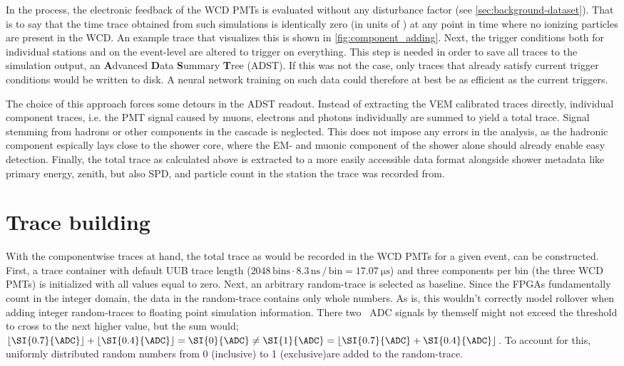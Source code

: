 In the process, the electronic feedback of the WCD PMTs is evaluated without any disturbance factor (see \autoref{sec:background-dataset}). That is to say that 
the time trace obtained from such simulations is identically zero (in units of \SI{}{\ADC}) at any point in time where no ionizing particles are present in the WCD. 
An example trace that visualizes this is shown in \autoref{fig:component_adding}. Next, the trigger conditions both for individual stations and on the event-level 
are altered to trigger on everything. This step is needed in order to save all traces to the simulation output, an \textbf{A}dvanced \textbf{D}ata \textbf{S}ummary 
\textbf{T}ree (ADST). If this was not the case, only traces that already satisfy current trigger conditions would be written to disk. A neural network training on 
such data could therefore at best be as efficient as the current triggers.

The choice of this approach forces some detours in the ADST readout. Instead of extracting the VEM calibrated traces directly, individual component traces, i.e. 
the PMT signal caused by muons, electrons and photons individually are summed to yield a total \SI{}{\ADC} trace. Signal stemming from hadrons or other components 
in the cascade is neglected. This does not impose any errors in the analysis, as the hadronic component espically lays close to the shower core, where the EM- and 
muonic component of the shower alone should already enable easy detection. Finally, the total trace as calculated above is extracted to a more easily accessible data 
format alongside shower metadata like primary energy, zenith, but also SPD, and particle count in the station the trace was recorded from.

\section{Trace building}
\label{sec:trace-building}

With the componentwise traces at hand, the total trace as would be recorded in the WCD PMTs for a given event, can be constructed. First, a trace container with 
default UUB trace length ($2048\,\text{bins}\cdot8.3\,\mathrm{ns}\,/\,\text{bin}=\SI{17.07}{\micro\second}$) and three components per bin (the three WCD PMTs) is 
initialized with all values equal to zero. Next, an arbitrary random-trace is selected as baseline. Since the FPGAs fundamentally count in the integer domain, the 
\SI{}{\ADC} data in the random-trace contains only whole numbers. As is, this wouldn't correctly model rollover when adding integer random-traces to floating point
simulation information. There two \SI{}{ADC} signals by themself might not exceed the threshold to cross to the next higher value, but the sum would; 
$\lfloor \SI{0.7}{\ADC} \rfloor + \lfloor \SI{0.4}{\ADC} \rfloor = \SI{0}{\ADC} \neq \SI{1}{\ADC} = \lfloor \SI{0.7}{\ADC} + \SI{0.4}{\ADC} \rfloor$. To account 
for this, uniformly distributed random numbers from 0 (inclusive) to 1 (exclusive)are added to the random-trace. 

